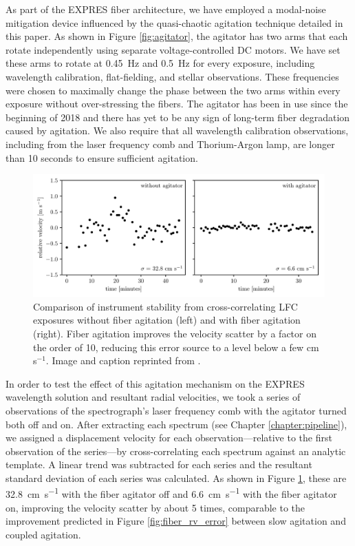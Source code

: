 As part of the EXPRES fiber architecture, we have employed a modal-noise mitigation device influenced by the quasi-chaotic agitation technique detailed in this paper. As shown in Figure \ref{fig:agitator}, the agitator has two arms that each rotate independently using separate voltage-controlled DC motors. We have set these arms to rotate at \SI{0.45}{\hertz} and \SI{0.5}{\hertz} for every exposure, including wavelength calibration, flat-fielding, and stellar observations. These frequencies were chosen to maximally change the phase between the two arms within every exposure without over-stressing the fibers. The agitator has been in use since the beginning of 2018 and there has yet to be any sign of long-term fiber degradation caused by agitation. We also require that all wavelength calibration observations, including from the laser frequency comb and Thorium-Argon lamp, are longer than 10 seconds to ensure sufficient agitation. 

\begin{figure}
    \centering
    \includegraphics[width=\textwidth]{figures-2/lfc_agitator_comp.pdf}
    \caption[EXPRES stability with and without fiber agitation]{Comparison of instrument stability from cross-correlating LFC exposures without fiber agitation (left) and with fiber agitation (right). Fiber agitation improves the velocity scatter by a factor on the order of 10, reducing this error source to a level below a few cm s$^{-1}$. Image and caption reprinted from \citet{blackman_performance_2020}.}
    \label{fig:lfc-agitator-comp}
\end{figure}

In order to test the effect of this agitation mechanism on the EXPRES wavelength solution and resultant radial velocities, we took a series of observations of the spectrograph's laser frequency comb with the agitator turned both off and on. After extracting each spectrum (see Chapter \ref{chapter:pipeline}), we assigned a displacement velocity for each observation---relative to the first observation of the series---by cross-correlating each spectrum against an analytic template. A linear trend \citep[caused by slow instrumental drifts, see Chapter \ref{pipeline:wavelength-calibration} and][]{blackman_performance_2020} was subtracted for each series and the resultant standard deviation of each series was calculated. As shown in Figure \ref{fig:lfc-agitator-comp}, these are 32.8~\si{\centi\meter\per\second} with the fiber agitator off and 6.6~\si{\centi\meter\per\second} with the fiber agitator on, improving the velocity scatter by about 5 times, comparable to the improvement predicted in Figure \ref{fig:fiber_rv_error} between slow agitation and coupled agitation.

